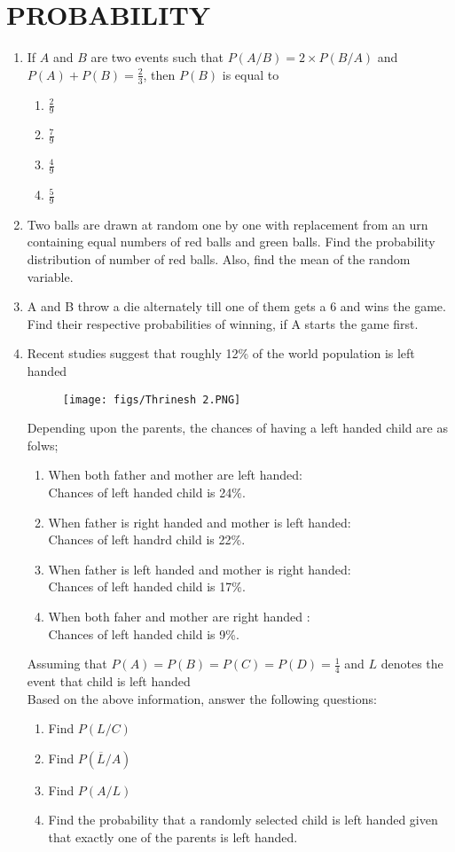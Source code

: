 \documentclass{article}
\begin{document}
\section{PROBABILITY}
\begin{enumerate}
\item If $A$ and $B$ are two events such that $P(A / B) = 2 \times P(B / A)$ and $P(A) + P(B) = \frac{2}{3}$, then $P(B)$ is equal to
\begin{enumerate}
\item $\frac{2}{9}$
\item $\frac{7}{9}$
\item $\frac{4}{9}$
\item $\frac{5}{9}$
\end{enumerate}
\item Two balls are drawn at random one by one with replacement from an urn containing equal numbers of red balls and green balls. Find the probability distribution of  number of red balls. Also, find the mean of the random variable.
\item A and B throw a die alternately till one of them gets a $6$ and wins the game. Find their respective probabilities of winning, if A starts the game first.
\item Recent studies suggest that roughly 12\% of the world population is left handed \\
\begin{figure}[H]
\centering
	\texttt{[image: figs/Thrinesh 2.PNG]}
\label{fig}
\end{figure}
Depending upon the parents, the chances of having a left handed child are as folws;
\begin{enumerate}
\item When both father and mother are left handed:\\
Chances of left handed child is 24\%.
\item When father is right handed and mother is left handed:\\
Chances of left handrd child is 22\%.
\item  When father is left handed and mother is right handed:\\
Chances of left handed child is 17\%.
\item  When both faher and mother are right handed :\\
Chances of left handed child is 9\%.
\end{enumerate}
Assuming that $P(A) = P(B) = P(C)= P(D) =\frac{1}{4}$ and $L$ denotes the event that child is left handed\\
Based on the above information, answer the following questions:
		\begin{enumerate}[label=(\roman*)]
			\item Find $P(L/C)$
			\item Find $P(\overline{L}/A)$ 
			\item Find $P(A/L)$
                        \item Find the probability that a randomly selected child is left handed given that exactly one of the parents is left handed.
		\end{enumerate}
\end{enumerate}
\end{document}
